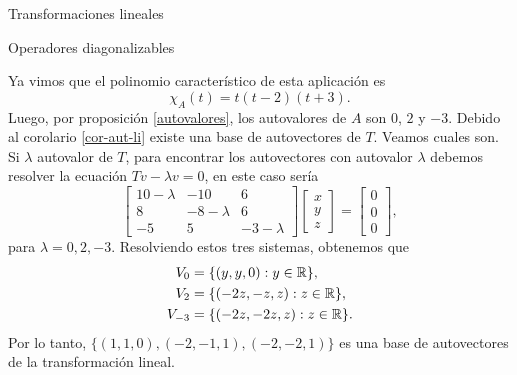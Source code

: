 \begin{chapter}{Transformaciones lineales}
\begin{section}{Operadores diagonalizables}
\begin{ejemplo*}
        Ya vimos que  el  polinomio característico de esta aplicación es 
        $$
        \chi_A(t) = t (t-2)(t+3).
        $$
        Luego, por 	proposición \ref{autovalores}, los autovalores de $A$ son $0$, $2$ y $-3$. Debido al corolario \ref{cor-aut-li} existe una base de autovectores de $T$. Veamos cuales son. Si $\lambda$ autovalor de $T$, para encontrar los autovectores con autovalor $\lambda$  debemos resolver la ecuación $Tv -\lambda v=0 $,  en este caso sería
        \begin{equation*}
        \begin{bmatrix}10- \lambda &-10&6\\8& -8- \lambda & 6\\-5& 5& -3- \lambda \end{bmatrix}
        \begin{bmatrix} x\\y\\z \end{bmatrix} =
        \begin{bmatrix} 0\\0 \\0\end{bmatrix},
        \end{equation*}  
        para $\lambda =0, 2,-3$. Resolviendo estos tres sistemas, obtenemos que 
        \begin{align*}
            V_0&= \{(y,y,0): y \in \mathbb R \},\\ 
            V_2 &= \{(-2z,-z,z): z \in \mathbb R \},\\ 
            V_{-3} &= \{(-2z,-2z,z): z \in \mathbb R \}. 
        \end{align*}
        Por lo tanto, $\{(1,1,0), (-2,-1,1), (-2,-2,1)\}$ es una base de autovectores de la transformación lineal. 
        \end{ejemplo*}
        

\end{section}
\end{chapter}
